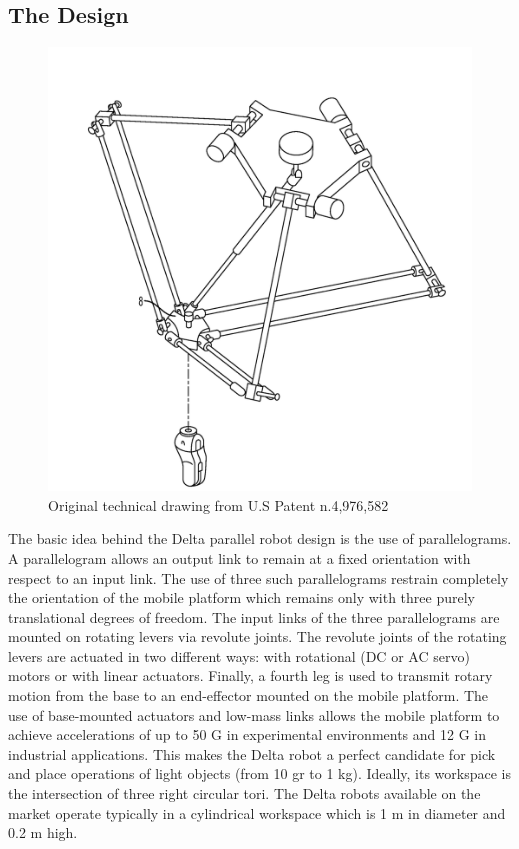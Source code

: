 \subsection{The Design}
\begin{figure}[H]
	\centering
	\includegraphics[width=\maxwidth{15cm}, keepaspectratio]{Chapters/Fig/deltarobot_first_design.png}
	\caption{Original technical drawing from U.S Patent n.4,976,582\cite{US_patent_deltarobot_thesis}}
	\label{fig:deltarobot_first_design}
\end{figure}
The basic idea behind the Delta parallel robot design is the use of parallelograms. A parallelogram allows an output link to remain at a fixed orientation with respect to an input link. The use of three such parallelograms restrain completely the orientation of the mobile platform which remains only with three purely translational degrees of freedom. The input links of the three parallelograms are mounted on rotating levers via revolute joints. The revolute joints of the rotating levers are actuated in two different ways: with rotational (DC or AC servo) motors or with linear actuators. Finally, a fourth leg is used to transmit rotary motion from the base to an end-effector mounted on the mobile platform\cite{intro_deltarobot_thesis}.
The use of base-mounted actuators and low-mass links allows the mobile platform to achieve accelerations of up to 50 G in experimental environments and 12 G in industrial applications. This makes the Delta robot a perfect candidate for pick and place operations of light objects (from 10 gr to 1 kg). Ideally, its workspace is the intersection of three right circular tori. The Delta robots available on the market operate typically in a cylindrical workspace which is 1 m in diameter and 0.2 m high.
